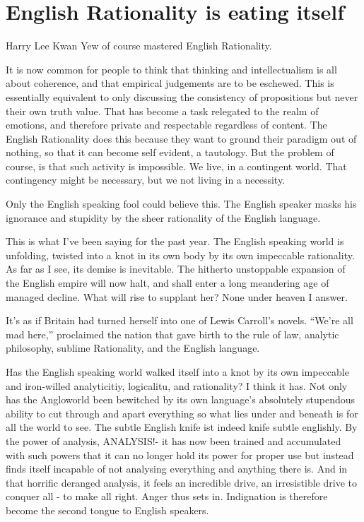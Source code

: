 \chapter{English Rationality is eating itself}

Harry Lee Kwan Yew of course mastered English Rationality.


It is now common for people to think that thinking and intellectualism is all about coherence, and that empirical judgements are to be eschewed. This is essentially equivalent to only discussing the consistency of propositions but never their own truth value. That has become a task relegated to the realm of emotions, and therefore private and respectable regardless of content. The English Rationality does this because they want to ground their paradigm out of nothing, so that it can become self evident, a tautology. But the problem of course, is that such activity is impossible. We live, in a contingent world. That contingency might be necessary, but we not living in a necessity. 


Only the English speaking fool could believe this. The English speaker masks his ignorance and stupidity by the sheer rationality of the English language. 



This is what I’ve been saying for the past year. The English speaking world is unfolding, twisted into a knot in its own body by its own impeccable rationality. As far as I see, its demise is inevitable. The hitherto unstoppable expansion of the English empire will now halt, and shall enter a long meandering age of managed decline. What will rise to supplant her? None under heaven I answer. 


It’s as if Britain had turned herself into one of Lewis Carroll’s novels. “We’re all mad here,” proclaimed the nation that gave birth to the rule of law, analytic philosophy, sublime Rationality, and the English language. 


Has the English speaking world walked itself into a knot by its own impeccable and iron-willed analyticitiy, logicalitu, and rationality? I think it has. Not only has the Angloworld been bewitched by its own language’s absolutely stupendous ability to cut through and apart everything so what lies under and beneath is for all the world to see. The subtle English knife ist indeed knife subtle englishly. By the power of analysis, ANALYSIS!- it has now been trained and accumulated with such powers that it can no longer hold its power for proper use but instead finds itself incapable of not analysing everything and anything there is. And in that horrific deranged analysis, it feels an incredible drive, an irresistible drive to conquer all - to make all right. Anger thus sets in. Indignation is therefore become the second tongue to English speakers. 

